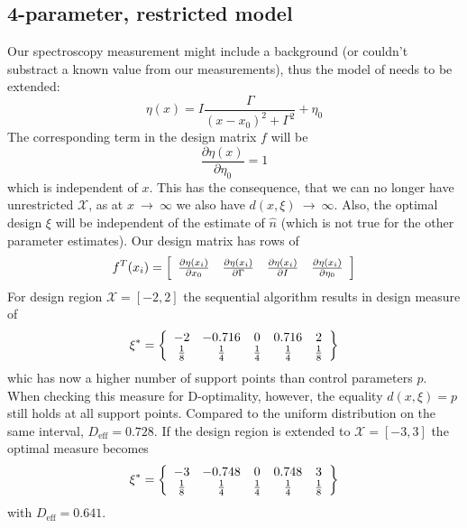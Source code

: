\documentclass[12pt]{iopart}
\begin{document}
\subsection{4-parameter, restricted model}

Our spectroscopy measurement might include a background (or couldn't substract a known value from our measurements), thus the model of  needs to be extended:
\begin{equation}
\eta(x) = I \frac{\Gamma}{(x - x_0)^2 + \Gamma^2} + \eta_0
\label{eq:lorentz4}
\end{equation}
The corresponding term in the design matrix $f$ will be
\begin{equation}
\frac{\partial \eta(x)}{\partial \eta_0} = 1
\end{equation}
which is independent of $x$. This has the consequence, that we can no longer have unrestricted $\mathcal{X}$, as at $x~\rightarrow~\infty$ we also have $d(x,\xi)~\rightarrow~\infty$. Also, the optimal design $\xi$ will be independent of the estimate of $\hat n$ (which is not true for the other parameter estimates). Our design matrix has rows of
\begin{equation}
 f^T(x_i) = \left[
  \begin{array}{l l l l}
   \frac{\partial \eta(x_i)}{\partial x_0} & \frac{\partial \eta(x_i)}{\partial \Gamma} & \frac{\partial \eta(x_i)}{\partial I} & \frac{\partial \eta(x_i)}{\partial \eta_0}
  \end{array} \right ]
\end{equation}
For design region $\mathcal{X} = [-2, 2]$ the sequential algorithm results in design measure of
\begin{equation}
\xi^* = \left\{
  \begin{array}{c c c c c}
    -2 & -0.716 & 0 & 0.716 & 2\\
    \frac{1}{8} & \frac{1}{4} & \frac{1}{4} & \frac{1}{4} & \frac{1}{8}\\
  \end{array} \right \}
\end{equation}
whic has now a higher number of support points than control parameters $p$. When checking this measure for D-optimality, however, the equality $d(x, \xi) = p$ still holds at all support points. Compared to the uniform distribution on the same interval, $D_\mathrm{eff} = 0.728$. If the design region is extended to $\mathcal{X} = [-3, 3]$ the optimal measure becomes
\begin{equation}
\xi^* = \left\{
  \begin{array}{c c c c c}
    -3 & -0.748 & 0 & 0.748 & 3\\
    \frac{1}{8} & \frac{1}{4} & \frac{1}{4} & \frac{1}{4} & \frac{1}{8}\\
  \end{array} \right \}
\end{equation}
with $D_\mathrm{eff} = 0.641$.
\end{document}
